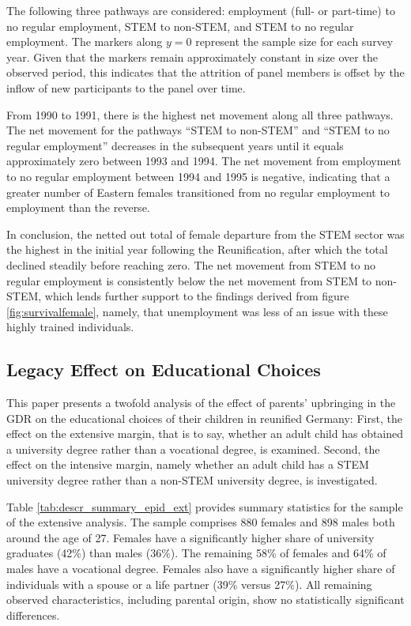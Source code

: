 \documentclass[a4paper, oneside, hyperfootnotes = false]{article}
\begin{document}
{The following three pathways are considered: employment (full- or part-time) to no regular employment, STEM to non-STEM, and STEM to no regular employment.
The markers along $y = 0$ represent the sample size for each survey year.
Given that the markers remain approximately constant in size over the observed period, this indicates that the attrition of panel members is offset by the inflow of new participants to the panel over time.

From 1990 to 1991, there is the highest net movement along all three pathways.
The net movement for the pathways ``STEM to non-STEM'' and ``STEM to no regular employment'' decreases in the subsequent years until it equals approximately zero between 1993 and 1994.
The net movement from employment to no regular employment between 1994 and 1995 is negative, indicating that a greater number of Eastern females transitioned from no regular employment to employment than the reverse.

In conclusion, the netted out total of female departure from the STEM sector was the highest in the initial year following the Reunification, after which the total declined steadily before reaching zero.
The net movement from STEM to no regular employment is consistently below the net movement from STEM to non-STEM, which lends further support to the findings derived from figure \ref{fig:survivalfemale}, namely, that unemployment was less of an issue with these highly trained individuals.

\subsection{Legacy Effect on Educational Choices}
\label{educational}

This paper presents a twofold analysis of the effect of parents' upbringing in the GDR on the educational choices of their children in reunified Germany:
First, the effect on the extensive margin, that is to say, whether an adult child has obtained a university degree rather than a vocational degree, is examined.
Second, the effect on the intensive margin, namely whether an adult child has a STEM university degree rather than a non-STEM university degree, is investigated.

Table \ref{tab:descr_summary_epid_ext} provides summary statistics for the sample of the extensive analysis.
The sample comprises 880 females and 898 males both around the age of 27.
Females have a significantly higher share of university graduates (42\%) than males (36\%).
The remaining 58\% of females and 64\% of males have a vocational degree.
Females also have a significantly higher share of individuals with a spouse or a life partner (39\% versus 27\%).
All remaining observed characteristics, including parental origin, show no statistically significant differences.

}
\end{document}
